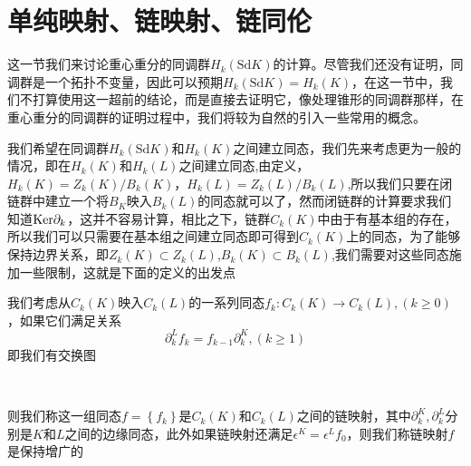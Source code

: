 \section{单纯映射、链映射、链同伦}
这一节我们来讨论重心重分的同调群$H_{k}(\text{Sd}K)$的计算。尽管我们还没有证明，同调群是一个拓扑不变量，因此可以预期$H_{k}(\text{Sd}K)=H_{k}(K)$，在这一节中，我们不打算使用这一超前的结论，而是直接去证明它，像处理锥形的同调群那样，在重心重分的同调群的证明过程中，我们将较为自然的引入一些常用的概念。

我们希望在同调群$H_{k}(\text{Sd}K)$和$H_{k}(K)$之间建立同态，我们先来考虑更为一般的情况，即在$H_{k}(K)$和$H_{k}(L)$之间建立同态,由定义，$H_{k}(K)=Z_{k}(K)/B_{k}(K)$，$H_{k}(L)=Z_{k}(L)/B_{k}(L)$,所以我们只要在闭链群中建立一个将$B_{K}$映入$B_{k}(L)$的同态就可以了，然而闭链群的计算要求我们知道${\rm Ker}\partial_{k}$，这并不容易计算，相比之下，链群$C_{k}(K)$中由于有基本组的存在，所以我们可以只需要在基本组之间建立同态即可得到$C_{k}(K)$上的同态，为了能够保持边界关系，即$Z_{k}(K)\subset Z_{k}(L)$,$B_{k}(K)\subset B_{k}(L)$,我们需要对这些同态施加一些限制，这就是下面的定义的出发点
\begin{definition}
我们考虑从$C_{k}(K)$映入$C_{k}(L)$的一系列同态$f_{k}:C_{k}(K)\rightarrow C_{k}(L),(k\geq 0)$，如果它们满足关系
\begin{equation*}
   \partial_{k}^{L}f_{k}=f_{k-1}\partial_{k}^{K},(k\geq 1) 
\end{equation*}
即我们有交换图
{\center
{}\\}
则我们称这一组同态$f=\left\{f_{k}\right\}$是$C_{k}(K)$和$C_{k}(L)$之间的链映射，其中$\partial_{k}^{K},\partial_{k}^{L}$分别是$K$和$L$之间的边缘同态，此外如果链映射还满足$\epsilon^{K}=\epsilon^{L}f_{0}$，则我们称链映射$f$是保持增广的
\end{definition}
